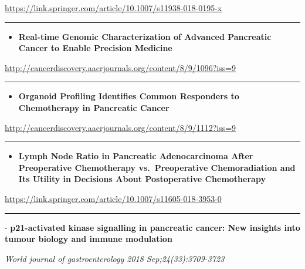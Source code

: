 \documentclass[]{article}
\providecommand{\tightlist}{%
  \setlength{\itemsep}{0pt}\setlength{\parskip}{0pt}}
\begin{document}
\url{https://link.springer.com/article/10.1007/s11938-018-0195-x}

\begin{center}\rule{0.5\linewidth}{\linethickness}\end{center}

\begin{itemize}
\tightlist
\item
  \textbf{Real-time Genomic Characterization of Advanced Pancreatic
  Cancer to Enable Precision Medicine}
\end{itemize}

\url{http://cancerdiscovery.aacrjournals.org/content/8/9/1096?iss=9}

\begin{center}\rule{0.5\linewidth}{\linethickness}\end{center}

\begin{itemize}
\tightlist
\item
  \textbf{Organoid Profiling Identifies Common Responders to
  Chemotherapy in Pancreatic Cancer}
\end{itemize}

\url{http://cancerdiscovery.aacrjournals.org/content/8/9/1112?iss=9}

\begin{center}\rule{0.5\linewidth}{\linethickness}\end{center}

\begin{itemize}
\tightlist
\item
  \textbf{Lymph Node Ratio in Pancreatic Adenocarcinoma After
  Preoperative Chemotherapy vs.~Preoperative Chemoradiation and Its
  Utility in Decisions About Postoperative Chemotherapy}
\end{itemize}

\url{https://link.springer.com/article/10.1007/s11605-018-3953-0}

\begin{center}\rule{0.5\linewidth}{\linethickness}\end{center}

 - \textbf{p21-activated kinase signalling in pancreatic cancer: New
insights into tumour biology and immune modulation}

\emph{World journal of gastroenterology 2018 Sep;24(33):3709-3723}
\end{document}
